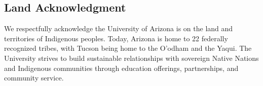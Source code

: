 \documentclass[fleqn,usenatbib]{mnras}
\begin{document}
\subsection{Land Acknowledgment} We respectfully acknowledge the University of Arizona is on the land and territories of Indigenous peoples. Today, Arizona is home to 22 federally recognized tribes, with Tucson being home to the O’odham and the Yaqui. The University strives to build sustainable relationships with sovereign Native Nations and Indigenous communities through education offerings, partnerships, and community service.




 


\bsp	%
\label{lastpage}
\end{document}

